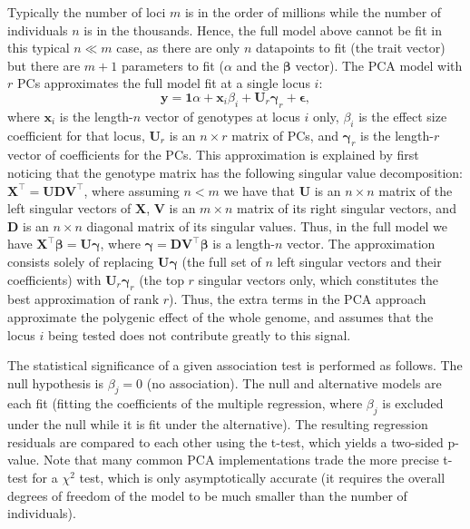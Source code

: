 \documentclass[11pt]{article}
\begin{document}
Typically the number of loci $m$ is in the order of millions while the number of individuals $n$ is in the thousands.
Hence, the full model above cannot be fit in this typical $n \ll m$ case, as there are only $n$ datapoints to fit (the trait vector) but there are $m+1$ parameters to fit ($\alpha$ and the $\mathbf{\beta}$ vector).
The PCA model with $r$ PCs approximates the full model fit at a single locus $i$:
\begin{equation}
  \label{eq:pca_gwas}
  \mathbf{y}
  =
  \mathbf{1} \alpha + \mathbf{x}_i \beta_i + \mathbf{U}_r \mathbf{\gamma}_r + \mathbf{\epsilon}
  ,
\end{equation}
where $\mathbf{x}_i$ is the length-$n$ vector of genotypes at locus $i$ only,
$\beta_i$ is the effect size coefficient for that locus,
$\mathbf{U}_r$ is an $n \times r$ matrix of PCs, and
$\mathbf{\gamma}_r$ is the length-$r$ vector of coefficients for the PCs.
This approximation is explained by first noticing that the genotype matrix has the following singular value decomposition:
$\mathbf{X}^\intercal = \mathbf{U} \mathbf{D} \mathbf{V}^\intercal$,
where assuming $n < m$ we have that
$\mathbf{U}$ is an $n \times n$ matrix of the left singular vectors of $\mathbf{X}$,
$\mathbf{V}$ is an $m \times n$ matrix of its right singular vectors, and
$\mathbf{D}$ is an $n \times n$ diagonal matrix of its singular values.
Thus, in the full model we have
$\mathbf{X}^\intercal \mathbf{\beta} = \mathbf{U} \mathbf{\gamma}$,
where
$\mathbf{\gamma} = \mathbf{D} \mathbf{V}^\intercal \mathbf{\beta}$ is a length-$n$ vector.
The approximation consists solely of replacing $\mathbf{U} \mathbf{\gamma}$ (the full set of $n$ left singular vectors and their coefficients) with $\mathbf{U}_r \mathbf{\gamma}_r$ (the top $r$ singular vectors only, which constitutes the best approximation of rank $r$).
Thus, the extra terms in the PCA approach approximate the polygenic effect of the whole genome, and assumes that the locus $i$ being tested does not contribute greatly to this signal.

The statistical significance of a given association test is performed as follows.
The null hypothesis is $\beta_j = 0$ (no association).
The null and alternative models are each fit (fitting the coefficients of the multiple regression, where $\beta_j$ is excluded under the null while it is fit under the alternative).
The resulting regression residuals are compared to each other using the t-test, which yields a two-sided p-value.
Note that many common PCA implementations trade the more precise t-test for a $\chi^2$ test, which is only asymptotically accurate (it requires the overall degrees of freedom of the model to be much smaller than the number of individuals).
\end{document}
